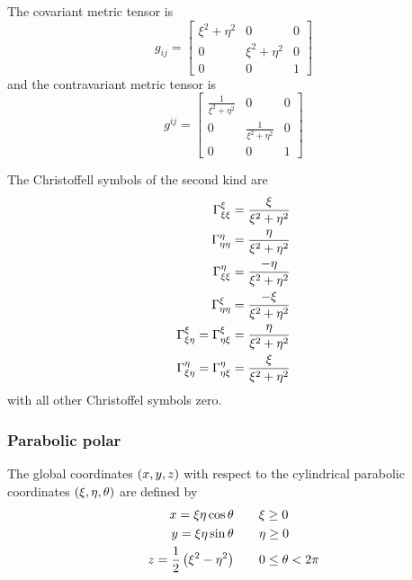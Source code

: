 The covariant metric tensor is
\begin{equation}
  g_{ij}=\begin{bmatrix}
    \xi^{2}+\eta^{2} & 0 & 0 \\
    0 & \xi^{2}+\eta^{2} & 0 \\
    0 & 0 & 1
  \end{bmatrix}
\end{equation}
and the contravariant metric tensor is
\begin{equation}
  g^{ij}=\begin{bmatrix}
    \frac{1}{\xi^{2}+\eta^{2}}& 0 & 0 \\
    0 & \frac{1}{\xi^{2}+\eta^{2}} & 0 \\
    0 & 0 & 1
  \end{bmatrix}
\end{equation}

The Christoffell symbols of the second kind are
\begin{align}
   \Gamma^{\xi}_{\xi\xi} &=\frac{\xi}{\xi^{2}+\eta^{2}} \\
   \Gamma^{\eta}_{\eta\eta} &=\frac{\eta}{\xi^{2}+\eta^{2}} \\
   \Gamma^{\eta}_{\xi\xi} &=\frac{-\eta}{\xi^{2}+\eta^{2}} \\
   \Gamma^{\xi}_{\eta\eta} &=\frac{-\xi}{\xi^{2}+\eta^{2}} \\
   \Gamma^{\xi}_{\xi\eta} = \Gamma^{\xi}_{\eta\xi} &=\frac{\eta}{\xi^{2}+\eta^{2}} \\
   \Gamma^{\eta}_{\xi\eta} = \Gamma^{\eta}_{\eta\xi} &=\frac{\xi}{\xi^{2}+\eta^{2}} \\
\end{align}
with all other Christoffel symbols zero.

\subsubsection{Parabolic polar}

The global coordinates $\left( x,y,z \right)$ with respect to the cylindrical parabolic
coordinates $\left( \xi,\eta,\theta \right)$  are defined by
\begin{equation}
  \begin{aligned}
    x = \xi\eta\cos\theta & \qquad \xi \ge 0 \\
    y = \xi\eta\sin\theta & \qquad \eta \ge 0 \\
    z = \frac{1}{2}\left( \xi^{2}-\eta^{2} \right) & \qquad 0 \le \theta < 2\pi
  \end{aligned}
\end{equation}

